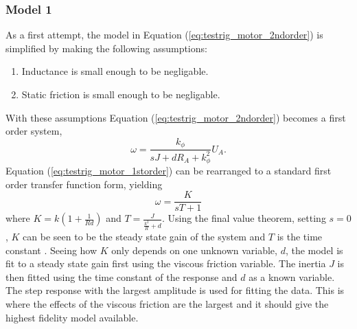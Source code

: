 \subsubsection{Model 1}
As a first attempt, the model in Equation (\ref{eq:testrig_motor_2ndorder}) is 
simplified by making the following assumptions:
\begin{enumerate}
    \item Inductance is small enough to be negligable.
    \item Static friction is small enough to be negligable.
\end{enumerate}
With these assumptions
Equation (\ref{eq:testrig_motor_2ndorder}) becomes a first order system,
\begin{equation} \label{eq:testrig_motor_1storder}
    \omega = \frac {k_{\phi}} {sJ + d R_A + k_{\phi}^2} U_A.
\end{equation}
Equation (\ref{eq:testrig_motor_1storder}) can be rearranged to a standard first
order transfer function form, yielding
\begin{equation} \label{eq:testrig_motor_1storder_rewrite}
    \omega = \frac {K} {s T + 1}
\end{equation}
where $K = k(1 + \frac{1} {R d})$ and $T = \frac {J} {\frac{k^2} {R} + d}$.
Using the final value theorem, setting $s = 0$, $K$ can be seen to be the steady
state gain of the system and $T$ is the time constant \cite{reglerteknik2006}.
Seeing how $K$ only depends on one unknown variable, $d$, the model is fit to a
steady state gain first using the viscous friction variable. The inertia $J$ is
then fitted using the time constant of the response and $d$ as a known variable.
The step response with the largest amplitude is used for fitting the data. This
is where the effects of the viscous friction are the largest and it should give
the highest fidelity model available. 

